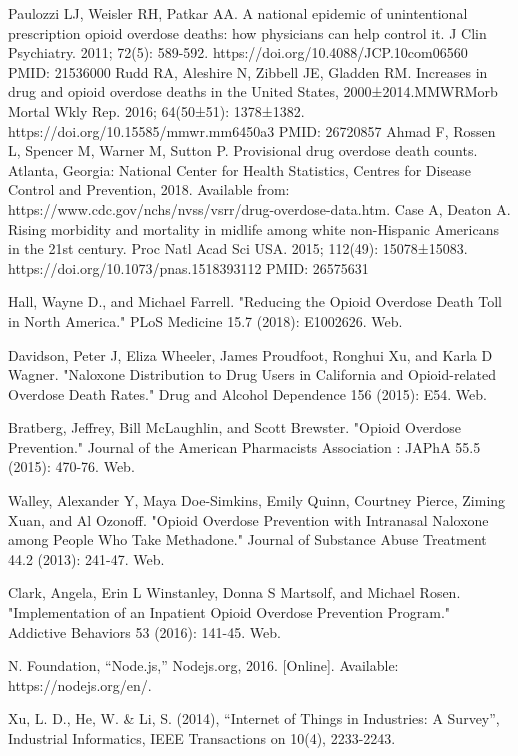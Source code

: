 \documentclass[conference]{IEEEtran}
\begin{document}
\begin{thebibliography}{00}
 Paulozzi LJ, Weisler RH, Patkar AA. A national epidemic of unintentional prescription opioid overdose deaths: how physicians can help control it. J Clin Psychiatry. 2011; 72(5): 589-592. https://doi.org/10.4088/JCP.10com06560 PMID: 21536000
 Rudd RA, Aleshire N, Zibbell JE, Gladden RM. Increases in drug and opioid overdose deaths in the United States, 2000±2014.MMWRMorb Mortal Wkly Rep. 2016; 64(50±51): 1378±1382. https://doi.org/10.15585/mmwr.mm6450a3 PMID: 26720857
 Ahmad F, Rossen L, Spencer M, Warner M, Sutton P. Provisional drug overdose death counts. Atlanta, Georgia: National Center for Health Statistics, Centres for Disease Control and Prevention, 2018. Available from: https://www.cdc.gov/nchs/nvss/vsrr/drug-overdose-data.htm.
 Case A, Deaton A. Rising morbidity and mortality in midlife among white non-Hispanic Americans in the 21st century. Proc Natl Acad Sci USA. 2015; 112(49): 15078±15083. https://doi.org/10.1073/pnas.1518393112 PMID: 26575631

 Hall, Wayne D., and Michael Farrell. "Reducing the Opioid Overdose Death Toll in North America." PLoS Medicine 15.7 (2018): E1002626. Web.

 Davidson, Peter J, Eliza Wheeler, James Proudfoot, Ronghui Xu, and Karla D Wagner. "Naloxone Distribution to Drug Users in California and Opioid-related Overdose Death Rates." Drug and Alcohol Dependence 156 (2015): E54. Web.

 Bratberg, Jeffrey, Bill McLaughlin, and Scott Brewster. "Opioid Overdose Prevention." Journal of the American Pharmacists Association : JAPhA 55.5 (2015): 470-76. Web.

 Walley, Alexander Y, Maya Doe-Simkins, Emily Quinn, Courtney Pierce, Ziming Xuan, and Al Ozonoff. "Opioid Overdose Prevention with Intranasal Naloxone among People Who Take Methadone." Journal of Substance Abuse Treatment 44.2 (2013): 241-47. Web.

 Clark, Angela, Erin L Winstanley, Donna S Martsolf, and Michael Rosen. "Implementation of an Inpatient Opioid Overdose Prevention Program." Addictive Behaviors 53 (2016): 141-45. Web.

N. Foundation, “Node.js,” Nodejs.org, 2016. [Online]. Available: https://nodejs.org/en/.

Xu, L. D., He, W. \& Li, S. (2014), “Internet of Things in Industries: A Survey”, Industrial Informatics, IEEE Transactions on 10(4), 2233-2243.


\end{thebibliography}
\end{document}
